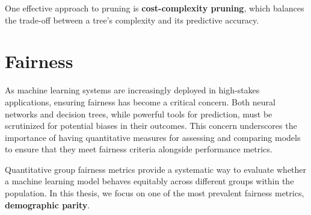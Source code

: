 One effective approach to pruning is \textbf{cost-complexity pruning},
which balances the trade-off between a tree's complexity and its predictive accuracy.
\cite{ccp}

\section{Fairness}
As machine learning systems are increasingly deployed in high-stakes applications,
ensuring fairness has become a critical concern.
Both neural networks and decision trees, while powerful tools for prediction,
must be scrutinized for potential biases in their outcomes.
This concern underscores the importance of having quantitative measures
for assessing and comparing models to ensure that they meet fairness criteria
alongside performance metrics.

Quantitative group fairness metrics provide a systematic way
to evaluate whether a machine learning model behaves equitably
across different groups within the population.
In this thesis, we focus on one of the most prevalent fairness metrics, \textbf{demographic parity}.
\cite{dem_parity}

